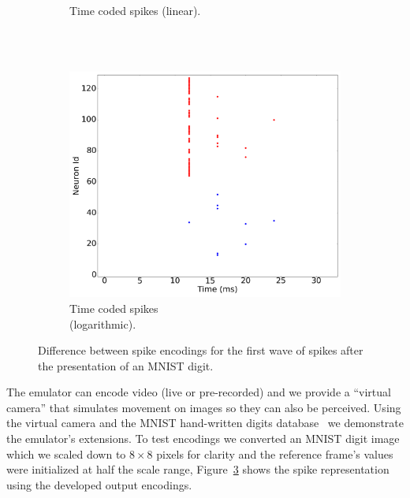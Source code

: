 \documentclass[conference]{IEEEtran}
\begin{document}
\begin{figure}[t]
\begin{subfigure}[b]{0.3\textwidth}
    \caption{Time coded spikes (linear).\\~}
    \label{fig:time_spikes}
  \end{subfigure}~
  \begin{subfigure}[b]{0.3\textwidth}
    \includegraphics[width=\textwidth]{time_exp_coded_-8x8-_cycle_0}
    \caption{Time coded spikes \\(logarithmic).}
    \label{fig:time_exp_spikes}
  \end{subfigure}
  
  \caption{Difference between spike encodings for the first wave of spikes after the presentation of an MNIST digit.}
  \label{fig:spike_codes}
\end{figure}

The emulator can encode video (live or pre-recorded) and we provide a ``virtual camera'' that simulates movement on images so they can also be perceived. Using the virtual camera and the MNIST hand-written digits database~\cite{mnist} we demonstrate the emulator's extensions. To test encodings we converted an MNIST digit image which we scaled down to $8\times8$ pixels for clarity and the reference frame's values were initialized at half the scale range, Figure~\ref{fig:spike_codes} shows the spike representation using the developed output encodings.
\end{document}
